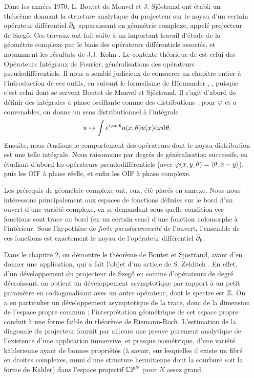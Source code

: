 Dane les années 1970, L. Boutet de Monvel et J. Sj\"ostrand \cite{BoutetdeMonvel1975} ont établi un théorème donnant la structure analytique du projecteur sur le noyau d'un certain opérateur différentiel $\overline{\partial}_b$ apparaissant en géométrie complexe, appelé projecteur de Szeg\H{o}. Ces travaux ont fait suite à un important travail d'étude de la géométrie complexe par le biais des opérateurs différentiels associés, et notamment les résultats de J.J. Kohn \cite{kohn1965extension}. Le contexte théorique de \cite{BoutetdeMonvel1975} est celui des Opérateurs Intégraux de Fourier, généralisations des opérateurs pseudodifférentiels. Il nous a semblé judicieux de consacrer un chapitre entier à l'introduction de ces outils, en suivant le formalisme de H\"ormander \cite{hormander2007}, \cite{hormander1985},\cite{hormander2003analysis} puisque c'est celui dont se servent Boutet de Monvel et Sj\"ostrand. Il s'agit d'abord de définir des intégrales à phase oscillante comme des distributions : pour $\varphi$ et $a$ convenables, on donne un sens distributionnel à l'intégrale 
\begin{equation*}
	u \mapsto \int e^{i\varphi{x,\theta}}a(x,\theta)u(x)\mathrm{d} x \mathrm{d} \theta.
\end{equation*}
Ensuite, nous étudions le comportement des opérateurs dont le noyau-distribution est une telle intégrale. Nous raisonnons par degrés de généralisation successifs, en étudiant d'abord les opérateurs pseudodifférentiels (avec $\varphi(x,y,\theta)=\langle \theta, x-y \rangle $), puis les OIF à phase réelle, et enfin les OIF à phase complexe.

Les prérequis de géométrie complexe ont, eux, été placés en annexe. Nous nous intéressons principalement aux espaces de fonctions définies sur le bord d'un ouvert d'une variété complexe, en se demandant sous quelle condition ces fonctions sont trace au bord (en un certain sens) d'une fonction holomorphe à l'intérieur. Sous l'hypothèse de \emph{forte pseudoconvexité} de l'ouvert, l'ensemble de ces fonctions est exactement le noyau de l'opérateur différentiel $\overline{\partial}_b$.

Dans le chapitre 2, on démontre le théorème de Boutet et Sj\"ostrand, avant d'en donner une application, qui a fait l'objet d'un article de S. Zelditch \cite{Zelditch2000}. En effet, d'un développement du projecteur de Szeg\H{o} en somme d'opérateurs de degré décroissant, on obtient un développement asymptotique par rapport à un petit paramètre en codiagonalisant avec un autre opérateur, dont le spectre est $\mathbb{Z}$. On a en particulier un développement asymptotique de la trace, donc de la dimension de l'espace propre commun ; l'interprétation géométrique de cet espace propre conduit à une forme faible du théorème de Riemann-Roch. L'estimation de la diagonale du projecteur fournit par ailleurs une preuve purement analytique de l'existence d'une application immersive, et presque isométrique, d'une variété k\"ahlerienne ayant de bonnes propriétés (à savoir, sur lesquelles il existe un fibré en droites complexes, muni d'une structure hermitienne dont la courbure soit la forme de K\"ahler) dans l'espace projectif $\mathbb{C}\mathbb{P}^N$ pour $N$ assez grand.

